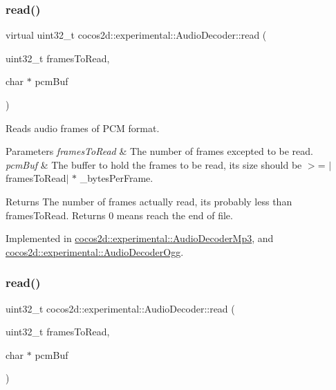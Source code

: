 \subsubsection{\texorpdfstring{read()}{read()}\hspace{0.1cm}{\footnotesize\ttfamily [1/2]}}
{\footnotesize\ttfamily virtual uint32\+\_\+t cocos2d\+::experimental\+::\+Audio\+Decoder\+::read (\begin{DoxyParamCaption}\item[{uint32\+\_\+t}]{frames\+To\+Read,  }\item[{char $\ast$}]{pcm\+Buf }\end{DoxyParamCaption})\hspace{0.3cm}{\ttfamily [pure virtual]}}



Reads audio frames of P\+CM format. 


\begin{DoxyParams}{Parameters}
{\em frames\+To\+Read} & The number of frames excepted to be read. \\
\hline
{\em pcm\+Buf} & The buffer to hold the frames to be read, its size should be $>$= $\vert$frames\+To\+Read$\vert$ $\ast$ \+\_\+bytes\+Per\+Frame. \\
\hline
\end{DoxyParams}
\begin{DoxyReturn}{Returns}
The number of frames actually read, it\textquotesingle{}s probably less than \textquotesingle{}frames\+To\+Read\textquotesingle{}. Returns 0 means reach the end of file. 
\end{DoxyReturn}


Implemented in \hyperlink{classcocos2d_1_1experimental_1_1AudioDecoderMp3_a9b033167139ff6d094fe27d79a2b78ad}{cocos2d\+::experimental\+::\+Audio\+Decoder\+Mp3}, and \hyperlink{classcocos2d_1_1experimental_1_1AudioDecoderOgg_ae0bc8e6b0efdf11ec12235c4095bb3b1}{cocos2d\+::experimental\+::\+Audio\+Decoder\+Ogg}.

\mbox{\label{classcocos2d_1_1experimental_1_1AudioDecoder_a08e022937ab16479dc381393df1bc3d5}} 
\subsubsection{\texorpdfstring{read()}{read()}\hspace{0.1cm}{\footnotesize\ttfamily [2/2]}}
{\footnotesize\ttfamily uint32\+\_\+t cocos2d\+::experimental\+::\+Audio\+Decoder\+::read (\begin{DoxyParamCaption}\item[{uint32\+\_\+t}]{frames\+To\+Read,  }\item[{char $\ast$}]{pcm\+Buf }\end{DoxyParamCaption})}



